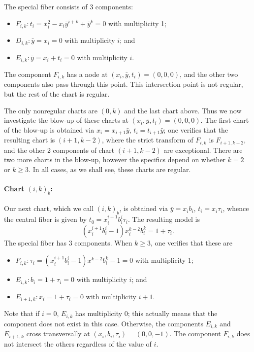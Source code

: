 \documentclass[reqno]{amsart}
\theoremstyle{definition}
\theoremstyle{remark}
\newcommand{\sy}{\bar{y}}
\begin{document}
The special fiber consists of 3 components:
\begin{itemize}
    \item $F_{i,k}: t_i = x_i^2 - x_i\sy^{i+k} + \sy^k = 0$ with multiplicity 1;
    \item $D_{i,k}: \sy = x_i = 0$ with multiplicity $i$; and
    \item $E_{i,k}: \sy = x_i + t_i = 0$ with multiplicity $i$.
\end{itemize}
The component $F_{i,k}$ has a node at $(x_i,\sy,t_i) = (0,0,0)$, and the other two components also pass through this point. This intersection point is not regular, but the rest of the chart is regular.

The only nonregular charts are $(0,k)$ and the last chart above. Thus we now investigate the blow-up of these charts at $(x_i,\sy,t_i) = (0,0,0)$. The first chart of the blow-up is obtained via $x_{i} = x_{i+1} \sy$, $t_{i} = t_{i+1} \sy$; one verifies that the resulting chart is $(i+1, k-2)$, where the strict transform of $F_{i,k}$ is $F_{i+1, k-2}$, and the other 2 components of chart $(i + 1, k-2)$ are exceptional. There are two more charts in the blow-up, however the specifics depend on whether $k=2$ or $k \geq 3$. In all cases, as we shall see, these charts are regular.

\paragraph{Chart $(i,k)_b$:}
\label{sec:chart-i-k_b}

Our next chart, which we call $(i,k)_b$, is obtained via $\sy = x_ib_i$, $t_i = x_i\tau_i$, whence the central fiber is given by $t_0 = x_i^{i+1}b_i^i\tau_i$. The resulting model is
\[
(x_i^{i+1}b_i^i - 1)x_i^{k-2} b_i^k = 1 + \tau_i.
\]
The special fiber has 3 components. When $k \geq 3$, one verifies that these are
\begin{itemize}
    \item $F_{i,k}: \tau_i = (x_i^{i+1}b_i^i - 1)x^{k-2} b_i^k - 1 = 0$ with multiplicity 1;
    \item $E_{i,k}: b_i = 1+\tau_i = 0$ with multiplicity $i$; and
    \item $E_{i+1,k}: x_i = 1+\tau_i = 0$ with multiplicity $i+1$.
\end{itemize}
Note that if $i = 0$, $E_{i,k}$ has multiplicity $0$; this actually means that the component does not exist in this case. Otherwise,
the components $E_{i,k}$ and $E_{i+1,k}$ cross transversally at $(x_i, b_i, \tau_i) = (0, 0, -1)$. The component $F_{i,k}$ does not intersect the others regardless of the value of $i$.
\end{document}
